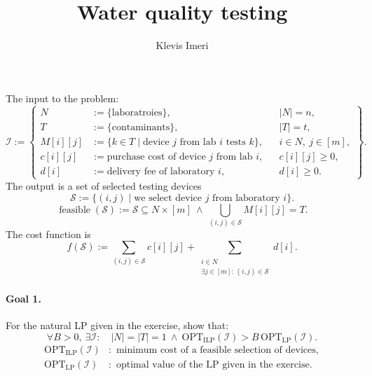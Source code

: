 \documentclass[12pt,a4paper]{article}
\title{Water quality testing}
\author{Klevis Imeri}
\date{}
\begin{document}
\maketitle

The input to the problem:
\[
\mathcal{I}:=\left\{
\begin{aligned}
N &:=\{\text{laboratroies}\}, && |N|=n,\\
T &:=\{\text{contaminants}\}, && |T|=t,\\
M[i][j] &:=\{k\in T\mid\text{device }j\text{ from lab }i\text{ tests }k\},
&& i\in N,\ j\in[m],\\
c[i][j] &:=\text{purchase cost of device }j\text{ from lab }i,
&& c[i][j]\geq0,\\
d[i] &:=\text{delivery fee of laboratory }i, && d[i]\geq0.
\end{aligned}
\right\}.
\]
The output is a set of selected testing devices
\[
\mathcal{S}:=\{(i,j)\mid\text{we select device }j\text{ from laboratory }i\}.
\]
\[
\operatorname{feasible}(\mathcal{S}):=
\mathcal{S}\subseteq N\times[m]
\ \land\
\bigcup_{(i,j)\in\mathcal{S}}M[i][j]=T.
\]
The cost function is
\[
f(\mathcal{S}):=
\sum_{(i,j)\in\mathcal{S}}c[i][j]
+\sum_{\substack{i\in N\\\exists j\in[m]:\,(i,j)\in\mathcal{S}}}d[i].
\]

\paragraph{Goal 1.}
For the natural LP given in the exercise, show that:
\[
\forall B>0,\ \exists\mathcal{I}:\quad
|N|=|T|=1
\ \land\
\mathrm{OPT}_{\mathrm{ILP}}(\mathcal{I})
>B\,\mathrm{OPT}_{\mathrm{LP}}(\mathcal{I}).
\]
\[
\begin{aligned}
\mathrm{OPT}_{\mathrm{ILP}}(\mathcal{I})
&:\text{ minimum cost of a feasible selection of devices},\\
\mathrm{OPT}_{\mathrm{LP}}(\mathcal{I})
&:\text{ optimal value of the LP given in the exercise}.
\end{aligned}
\]
\end{document}
